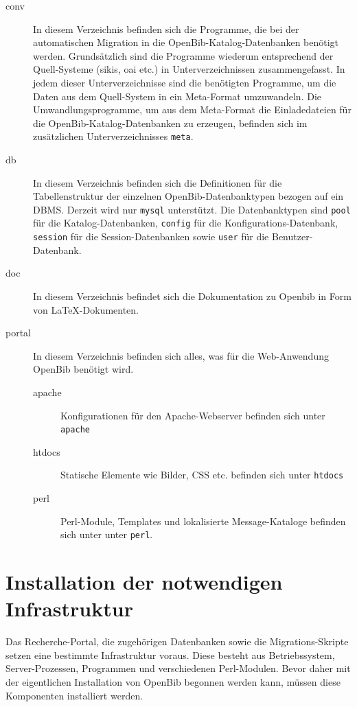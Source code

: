 \documentclass[11pt, twoside, a4paper, BCOR8mm, DIV12, bibtotoc,idxtotoc]{scrbook}
\begin{document}
\begin{description}
\item[conv] In diesem Verzeichnis befinden sich die Programme, die bei
  der automatischen Migration in die OpenBib-Katalog-Datenbanken
  benötigt werden. Grundsätzlich sind die Programme wiederum
  entsprechend der Quell-Systeme (sikis, oai etc.) in
  Unterverzeichnissen zusammengefasst. In jedem dieser
  Unterverzeichnisse sind die benötigten Programme, um die Daten aus
  dem Quell-System in ein Meta-Format umzuwandeln. Die
  Umwandlungsprogramme, um aus dem Meta-Format die Einladedateien für
  die OpenBib-Katalog-Datenbanken zu erzeugen, befinden sich im
  zusätzlichen Unterverzeichnisses \texttt{meta}.
\item[db] In diesem Verzeichnis befinden sich die Definitionen für die
  Tabellenstruktur der einzelnen OpenBib-Datenbanktypen bezogen auf
  ein DBMS. Derzeit wird nur \texttt{mysql} unterstützt. Die
  Datenbanktypen sind \texttt{pool} für die Katalog-Datenbanken,
  \texttt{config} für die Konfigurations-Datenbank, \texttt{session}
  für die Session-Datenbanken sowie \texttt{user} für die
  Benutzer-Datenbank.
\item[doc] In diesem Verzeichnis befindet sich die Dokumentation zu
  Openbib in Form von LaTeX-Dokumenten.
\item[portal] In diesem Verzeichnis befinden sich alles, was für die
  Web-Anwendung OpenBib benötigt wird.
  \begin{description}
  \item[apache] Konfigurationen für den Apache-Webserver befinden sich
    unter \texttt{apache}
  \item[htdocs] Statische Elemente wie Bilder, CSS etc. befinden sich unter \texttt{htdocs}
  \item[perl] Perl-Module, Templates und lokalisierte Message-Kataloge
    befinden sich unter unter \texttt{perl}.
  \end{description}
\end{description}

\chapter{Installation der notwendigen Infrastruktur}
Das Recherche-Portal, die zugehörigen Datenbanken sowie die
Migrations-Skripte setzen eine bestimmte Infrastruktur voraus. Diese
besteht aus Betriebssystem, Server-Prozessen, Programmen und
verschiedenen Perl-Modulen. Bevor daher mit der eigentlichen
Installation von OpenBib begonnen werden kann, müssen diese
Komponenten installiert werden.
\end{document}
